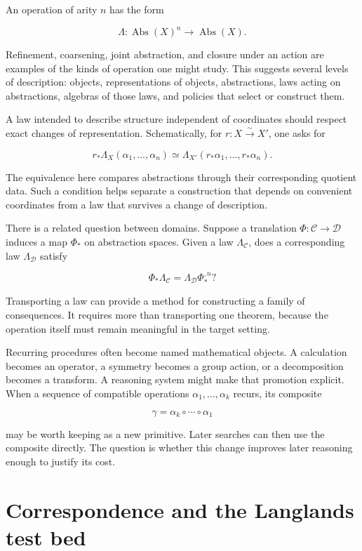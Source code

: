 \documentclass[11pt,oneside,openany]{book}
\begin{document}
An operation of arity \(n\) has the form

\[
\Lambda:\operatorname{Abs}(X)^n\longrightarrow\operatorname{Abs}(X).
\]

Refinement, coarsening, joint abstraction, and closure under an action are examples of the kinds of operation one might study. This suggests several levels of description: objects, representations of objects, abstractions, laws acting on abstractions, algebras of those laws, and policies that select or construct them.

A law intended to describe structure independent of coordinates should respect exact changes of representation. Schematically, for \(r:X\xrightarrow{\sim}X'\), one asks for

\[
r_*\Lambda_X(\alpha_1,\ldots,\alpha_n)
\simeq
\Lambda_{X'}(r_*\alpha_1,\ldots,r_*\alpha_n).
\]

The equivalence here compares abstractions through their corresponding quotient data. Such a condition helps separate a construction that depends on convenient coordinates from a law that survives a change of description.

There is a related question between domains. Suppose a translation \(\Phi:\mathcal C\longrightarrow\mathcal D\) induces a map \(\Phi_*\) on abstraction spaces. Given a law \(\Lambda_{\mathcal C}\), does a corresponding law \(\Lambda_{\mathcal D}\) satisfy

\[
\Phi_*\Lambda_{\mathcal C}
=\Lambda_{\mathcal D}\Phi_*^{,n}?
\]

Transporting a law can provide a method for constructing a family of consequences. It requires more than transporting one theorem, because the operation itself must remain meaningful in the target setting.

Recurring procedures often become named mathematical objects. A calculation becomes an operator, a symmetry becomes a group action, or a decomposition becomes a transform. A reasoning system might make that promotion explicit. When a sequence of compatible operations \(\alpha_1,\ldots,\alpha_k\) recurs, its composite

\[
\gamma=\alpha_k\circ\cdots\circ\alpha_1
\]

may be worth keeping as a new primitive. Later searches can then use the composite directly. The question is whether this change improves later reasoning enough to justify its cost.

\chapter{Correspondence and the Langlands test bed}
\end{document}
